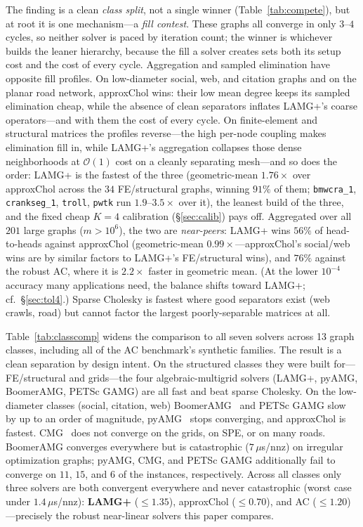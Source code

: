 \documentclass{siamart220329}
\newcommand{\Oone}{\mathcal{O}(1)}
\begin{document}
The finding is a clean \emph{class split}, not a single winner (Table~\ref{tab:compete}), but at root it is one
mechanism---a \emph{fill contest}. These graphs all converge in only $3$--$4$ cycles, so neither
solver is paced by iteration count; the winner is whichever builds the leaner hierarchy,
because the fill a solver creates sets both its setup cost and the cost of every cycle. Aggregation
and sampled elimination have opposite fill profiles. On low-diameter social, web, and citation
graphs and on the planar road network, approxChol wins: their low mean degree keeps its sampled
elimination cheap, while the absence of clean separators inflates LAMG+'s coarse operators---and with
them the cost of every cycle. On finite-element and structural matrices the profiles reverse---the high per-node
coupling makes elimination fill in, while LAMG+'s aggregation collapses those dense neighborhoods at
$\Oone$ cost on a cleanly separating mesh---and so does the order: LAMG+ is the fastest of the three (geometric-mean
$1.76\times$ over approxChol across the $34$ FE/structural graphs, winning $91\%$ of them;
\texttt{bmwcra\_1}, \texttt{crankseg\_1}, \texttt{troll}, \texttt{pwtk} run $1.9$--$3.5\times$ over
it), the leanest build of the three, and the fixed cheap $K{=}4$ calibration (\S\ref{sec:calib})
pays off. Aggregated over all
$201$ large graphs ($m>10^6$), the two are \emph{near-peers}: LAMG+ wins $56\%$ of head-to-heads
against approxChol (geometric-mean $0.99\times$---approxChol's social/web
wins are by similar factors to LAMG+'s FE/structural wins), and $76\%$ against the robust AC, where
it is $2.2\times$ faster in geometric mean. (At the lower $10^{-4}$ accuracy many applications need, the balance shifts toward LAMG+; cf.~\S\ref{sec:tol4}.) Sparse Cholesky is fastest where good separators exist (web crawls, road)
but cannot factor the largest poorly-separable matrices at all.

Table~\ref{tab:classcomp} widens the comparison to all seven solvers across 13 graph classes,
including all of the AC benchmark's synthetic families. The result is a clean
separation by design intent. On the structured classes they were built for---FE/structural
and grids---the four algebraic-multigrid solvers (LAMG+, pyAMG, BoomerAMG, PETSc GAMG) are all fast
and beat sparse Cholesky. On the low-diameter classes (social, citation, web) BoomerAMG~\cite{boomeramg} and PETSc GAMG slow by up to an order of magnitude, pyAMG~\cite{pyamg}
stops converging, and approxChol is fastest. CMG~\cite{cmg} does not converge on the grids,
on SPE, or on many roads. BoomerAMG converges everywhere but is catastrophic ($7\,\mu$s/nnz) on
irregular optimization graphs; pyAMG, CMG, and PETSc GAMG additionally fail to converge on $11$, $15$, and $6$ of
the instances, respectively. Across all classes only three solvers are both convergent
everywhere and never catastrophic (worst case under $1.4\,\mu$s/nnz): \textbf{LAMG+}
($\le1.35$), approxChol ($\le0.70$), and AC ($\le1.20$)---precisely the robust near-linear
solvers this paper compares.
\end{document}
